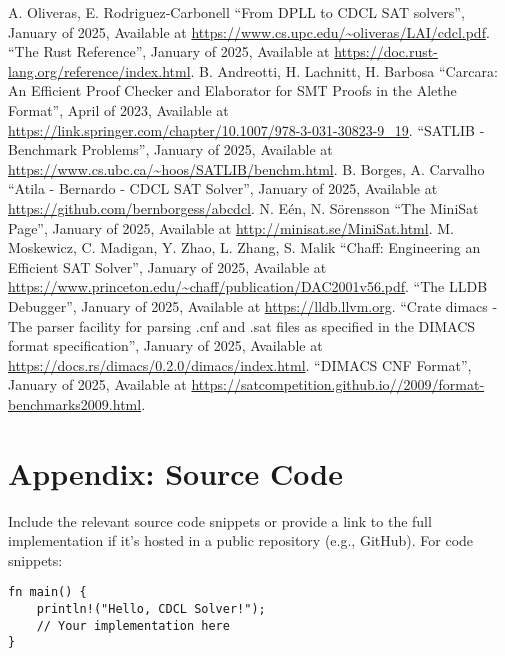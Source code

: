\documentclass[a4paper,12pt]{article}
\begin{document}
\begin{thebibliography}{00}
             A. Oliveras, E. Rodriguez-Carbonell ``From DPLL to CDCL SAT solvers'', January of 2025, Available at \url{https://www.cs.upc.edu/~oliveras/LAI/cdcl.pdf}.
                  ``The Rust Reference'', January of 2025, Available at \url{https://doc.rust-lang.org/reference/index.html}.
                   B. Andreotti, H. Lachnitt, H. Barbosa ``Carcara: An Efficient Proof Checker and Elaborator for SMT Proofs in the Alethe Format'', April of 2023, Available at \url{https://link.springer.com/chapter/10.1007/978-3-031-30823-9\_19}.
             ``SATLIB - Benchmark Problems'', January of 2025, Available at \url{https://www.cs.ubc.ca/~hoos/SATLIB/benchm.html}.
              B. Borges, A. Carvalho ``Atila - Bernardo - CDCL SAT Solver'', January of 2025, Available at \url{https://github.com/bernborgess/abcdcl}.
                   N. Eén, N. Sörensson ``The MiniSat Page'', January of 2025, Available at \url{http://minisat.se/MiniSat.html}.
                     M. Moskewicz, C. Madigan, Y. Zhao, L. Zhang, S. Malik ``Chaff: Engineering an Efficient SAT Solver'', January of 2025, Available at \url{https://www.princeton.edu/~chaff/publication/DAC2001v56.pdf}.
                      ``The LLDB Debugger'', January of 2025, Available at \url{https://lldb.llvm.org}.
               ``Crate dimacs - The parser facility for parsing .cnf and .sat files as specified in the DIMACS format specification'', January of 2025, Available at \url{https://docs.rs/dimacs/0.2.0/dimacs/index.html}.
              ``DIMACS CNF Format'', January of 2025, Available at \url{https://satcompetition.github.io//2009/format-benchmarks2009.html}.
\end{thebibliography}

\newpage
\appendix
\section{Appendix: Source Code}
\label{sec:appendix}
Include the relevant source code snippets or provide a link to the full implementation if it's hosted in a public repository (e.g., GitHub). For code snippets:
\begin{verbatim}
fn main() {
    println!("Hello, CDCL Solver!");
    // Your implementation here
}
\end{verbatim}
\end{document}
